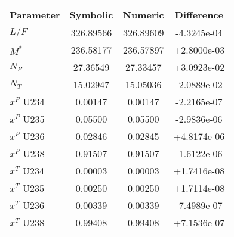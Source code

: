 \begin{tabular}{|l||c|c|c|}
\hline
\bf{Parameter} & \bf{Symbolic} & \bf{Numeric} & \bf{Difference} \\
\hline
$L/F$ & 326.89566 & 326.89609 & -4.3245e-04 \\
\hline
$M^*$ & 236.58177 & 236.57897 & +2.8000e-03 \\
\hline
$N_P$ & 27.36549 & 27.33457 & +3.0923e-02 \\
\hline
$N_T$ & 15.02947 & 15.05036 & -2.0889e-02 \\
\hline
$x^P$ U234 & 0.00147 & 0.00147 & -2.2165e-07 \\
\hline
$x^P$ U235 & 0.05500 & 0.05500 & -2.9836e-06 \\
\hline
$x^P$ U236 & 0.02846 & 0.02845 & +4.8174e-06 \\
\hline
$x^P$ U238 & 0.91507 & 0.91507 & -1.6122e-06 \\
\hline
$x^T$ U234 & 0.00003 & 0.00003 & +1.7416e-08 \\
\hline
$x^T$ U235 & 0.00250 & 0.00250 & +1.7114e-08 \\
\hline
$x^T$ U236 & 0.00339 & 0.00339 & -7.4989e-07 \\
\hline
$x^T$ U238 & 0.99408 & 0.99408 & +7.1536e-07 \\
\hline
\end{tabular}
